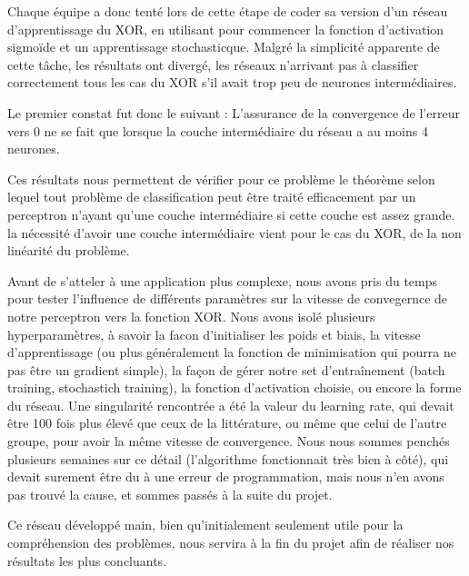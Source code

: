 \documentclass[
    10pt,
    a4paper,
    oneside,
    headinclude,footinclude,
    BCOR=5mm,
    captions=tableabove
]{scrartcl}
\begin{document}
Chaque équipe a donc tenté lors de cette étape de coder sa version d'un réseau d'apprentissage du XOR, en utilisant pour commencer la fonction d'activation sigmoïde et un apprentissage stochasticque. Malgré la simplicité apparente de cette tâche, les résultats ont divergé, les réseaux n'arrivant pas à classifier correctement tous les cas du XOR s'il avait trop peu de neurones intermédiaires.

Le premier constat fut donc le suivant : L'assurance de la convergence de l'erreur vers $0$ ne se fait que lorsque la couche intermédiaire du réseau a au moins 4 neurones.

Ces résultats nous permettent de vérifier pour ce problème le théorème selon lequel tout problème de classification peut être traité efficacement par un perceptron n'ayant qu'une couche intermédiaire si cette couche est assez grande. la nécessité d'avoir une couche intermédiaire vient pour le cas du XOR, de la non linéarité du problème.

Avant de s'atteler à une application plus complexe, nous avons pris du temps pour tester l'influence de différents paramètres sur la vitesse de convegernce de notre perceptron vers la fonction XOR. 
Nous avons isolé plusieurs hyperparamètres, à savoir  la facon d'initialiser les poids et biais, la vitesse d'apprentissage (ou plus généralement la fonction de minimisation qui pourra ne pas être un gradient simple), la façon de gérer notre set d'entraînement (batch training, stochastich training), la fonction d'activation choisie, ou encore la forme du réseau.
Une singularité rencontrée a été la valeur du learning rate, qui devait être 100 fois plus élevé que ceux de la littérature, ou même que celui de l'autre groupe, pour avoir la même vitesse de convergence. Nous nous sommes penchés plusieurs semaines sur ce détail (l'algorithme fonctionnait très bien à côté), qui devait surement être du à une erreur de programmation, mais nous n'en avons pas trouvé la cause, et sommes passés à la suite du projet.

Ce réseau développé main, bien qu'initialement seulement utile pour la compréhension des problèmes, nous servira à la fin du projet afin de réaliser nos résultats les plus concluants.
\end{document}
